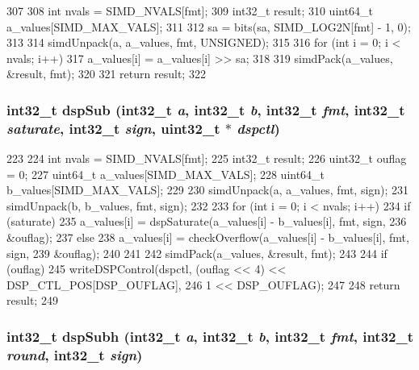 \begin{DoxyCode}
307 {
308     int nvals = SIMD_NVALS[fmt];
309     int32_t result;
310     uint64_t a_values[SIMD_MAX_VALS];
311 
312     sa = bits(sa, SIMD_LOG2N[fmt] - 1, 0);
313 
314     simdUnpack(a, a_values, fmt, UNSIGNED);
315 
316     for (int i = 0; i < nvals; i++)
317         a_values[i] = a_values[i] >> sa;
318 
319     simdPack(a_values, &result, fmt);
320 
321     return result;
322 }
\end{DoxyCode}
\hypertarget{namespaceMipsISA_a6fe8ea50b57a4afbe6899cf5fcd52298}{
\subsubsection[{dspSub}]{\setlength{\rightskip}{0pt plus 5cm}int32\_\-t dspSub (int32\_\-t {\em a}, \/  int32\_\-t {\em b}, \/  int32\_\-t {\em fmt}, \/  int32\_\-t {\em saturate}, \/  int32\_\-t {\em sign}, \/  {\bf uint32\_\-t} $\ast$ {\em dspctl})}}
\label{namespaceMipsISA_a6fe8ea50b57a4afbe6899cf5fcd52298}



\begin{DoxyCode}
223 {
224     int nvals = SIMD_NVALS[fmt];
225     int32_t result;
226     uint32_t ouflag = 0;
227     uint64_t a_values[SIMD_MAX_VALS];
228     uint64_t b_values[SIMD_MAX_VALS];
229 
230     simdUnpack(a, a_values, fmt, sign);
231     simdUnpack(b, b_values, fmt, sign);
232 
233     for (int i = 0; i < nvals; i++) {
234         if (saturate)
235             a_values[i] = dspSaturate(a_values[i] - b_values[i], fmt, sign,
236                                       &ouflag);
237         else
238             a_values[i] = checkOverflow(a_values[i] - b_values[i], fmt, sign,
239                                         &ouflag);
240     }
241 
242     simdPack(a_values, &result, fmt);
243 
244     if (ouflag)
245         writeDSPControl(dspctl, (ouflag << 4) << DSP_CTL_POS[DSP_OUFLAG],
246                         1 << DSP_OUFLAG);
247 
248     return result;
249 }
\end{DoxyCode}
\hypertarget{namespaceMipsISA_ae22415bc9fdff6776d8b6d96a0dbea4e}{
\subsubsection[{dspSubh}]{\setlength{\rightskip}{0pt plus 5cm}int32\_\-t dspSubh (int32\_\-t {\em a}, \/  int32\_\-t {\em b}, \/  int32\_\-t {\em fmt}, \/  int32\_\-t {\em round}, \/  int32\_\-t {\em sign})}}
\label{namespaceMipsISA_ae22415bc9fdff6776d8b6d96a0dbea4e}



